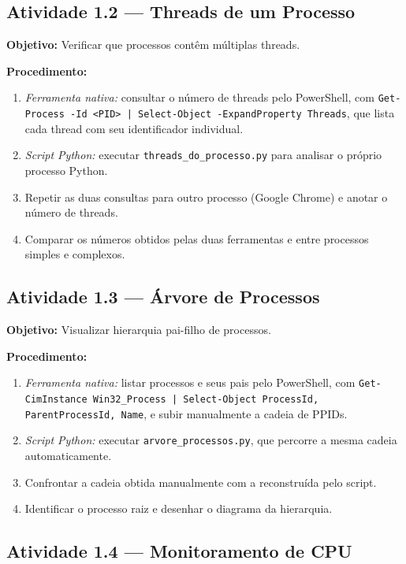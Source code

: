 \documentclass[12pt,a4paper]{article}
\begin{document}
\subsection{Atividade 1.2 — Threads de um Processo}

\textbf{Objetivo:} Verificar que processos contêm múltiplas threads.

\textbf{Procedimento:}
\begin{enumerate}
    \item \textit{Ferramenta nativa:} consultar o número de threads pelo PowerShell, com \texttt{Get-Process -Id <PID> | Select-Object -ExpandProperty Threads}, que lista cada thread com seu identificador individual.
    \item \textit{Script Python:} executar \texttt{threads\_do\_processo.py} para analisar o próprio processo Python.
    \item Repetir as duas consultas para outro processo (Google Chrome) e anotar o número de threads.
    \item Comparar os números obtidos pelas duas ferramentas e entre processos simples e complexos.
\end{enumerate}

\subsection{Atividade 1.3 — Árvore de Processos}

\textbf{Objetivo:} Visualizar hierarquia pai-filho de processos.

\textbf{Procedimento:}
\begin{enumerate}
    \item \textit{Ferramenta nativa:} listar processos e seus pais pelo PowerShell, com \texttt{Get-CimInstance Win32\_Process | Select-Object ProcessId, ParentProcessId, Name}, e subir manualmente a cadeia de PPIDs.
    \item \textit{Script Python:} executar \texttt{arvore\_processos.py}, que percorre a mesma cadeia automaticamente.
    \item Confrontar a cadeia obtida manualmente com a reconstruída pelo script.
    \item Identificar o processo raiz e desenhar o diagrama da hierarquia.
\end{enumerate}

\subsection{Atividade 1.4 — Monitoramento de CPU}
\end{document}
